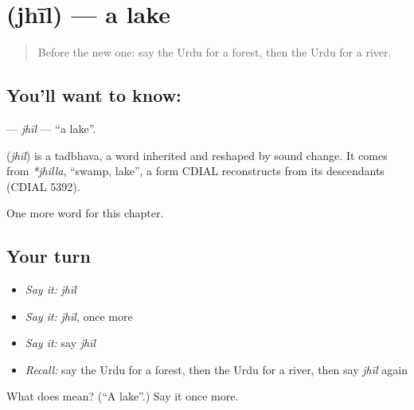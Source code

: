 \section[\texorpdfstring{\ur{جھیل} (jhīl)}{جھیل (jhīl)}]{ (jhīl) — a lake}

\label{lesson:UR-C64-jhil}



\begin{quote}
Before the new one: say the Urdu for a forest, then the Urdu for a river.
\end{quote}

\subsection*{You'll want to know: }
\textbf{} — \emph{jhīl} — \textquotedblleft{}a lake\textquotedblright{}.

\begin{cousinweb}
\textbf{} (\emph{jhīl}) is a tadbhava, a word inherited and reshaped by sound change. It comes from \emph{*jhilla}, \textquotedblleft{}swamp, lake\textquotedblright{}, a form CDIAL reconstructs from its descendants (CDIAL 5392).
\end{cousinweb}

\begin{grammarlens}[title={What you've built}]
One more word for this chapter.
\end{grammarlens}

\subsection*{Your turn}
\begin{itemize}
\raggedright
  \item \emph{Say it:} \emph{jhīl}
  \item \emph{Say it:} \emph{jhīl}, once more
  \item \emph{Say it:} say \emph{jhīl}
  \item \emph{Recall:} say the Urdu for a forest, then the Urdu for a river, then say \emph{jhīl} again
\end{itemize}

\begin{tcolorbox}[breakable,colback=teal!4,colframe=teal!35!black,title={Before you move on}]
What does  mean? (\textquotedblleft{}A lake\textquotedblright{}.) Say it once more.
\end{tcolorbox}

